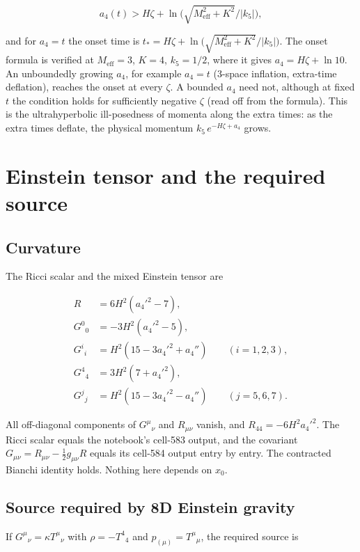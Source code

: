 \documentclass[11pt]{article}
\begin{document}
\[
a_4(t)>H\zeta+\ln\bigl(\sqrt{M_{\mathrm{eff}}^2+K^2}/|k_5|\bigr),
\]

and for $a_4=t$ the onset time is $t_\ast=H\zeta+\ln\bigl(\sqrt{M_{\mathrm{eff}}^2+K^2}/|k_5|\bigr)$. The onset formula is verified at $M_{\mathrm{eff}}=3$, $K=4$, $k_5=1/2$, where it gives $a_4=H\zeta+\ln10$. An unboundedly growing $a_4$, for example $a_4=t$ (3-space inflation, extra-time deflation), reaches the onset at every $\zeta$. A bounded $a_4$ need not, although at fixed $t$ the condition holds for sufficiently negative $\zeta$ (read off from the formula). This is the ultrahyperbolic ill-posedness of momenta along the extra times: as the extra times deflate, the physical momentum $k_5\,e^{-H\zeta+a_4}$ grows.

\section{Einstein tensor and the required source}

\subsection{Curvature}

The Ricci scalar and the mixed Einstein tensor are

\[
\begin{aligned}
R&=6H^2(a_4'^2-7), \\
G^0{}_0&=-3H^2(a_4'^2-5), \\
G^i{}_i&=H^2(15-3a_4'^2+a_4'')\qquad(i=1,2,3), \\
G^4{}_4&=3H^2(7+a_4'^2), \\
G^j{}_j&=H^2(15-3a_4'^2-a_4'')\qquad(j=5,6,7).
\end{aligned}
\]

All off-diagonal components of $G^\mu{}_\nu$ and $R_{\mu\nu}$ vanish, and $R_{44}=-6H^2a_4'^2$. The Ricci scalar equals the notebook's cell-583 output, and the covariant $G_{\mu\nu}=R_{\mu\nu}-\tfrac12g_{\mu\nu}R$ equals its cell-584 output entry by entry. The contracted Bianchi identity holds. Nothing here depends on $x_0$.

\subsection{Source required by 8D Einstein gravity}

If $G^\mu{}_\nu=\kappa T^\mu{}_\nu$ with $\rho=-T^4{}_4$ and $p_{(\mu)}=T^\mu{}_\mu$, the required source is
\end{document}
